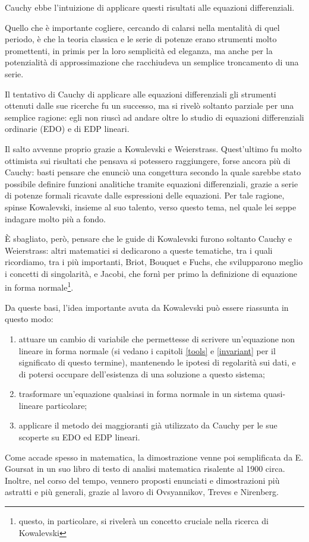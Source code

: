Cauchy ebbe l'intuizione di applicare questi risultati alle equazioni differenziali. 

Quello che è importante cogliere, cercando di calarsi nella mentalità di quel periodo, è che la teoria classica e le serie di potenze erano strumenti molto promettenti, in primis per la loro semplicità ed eleganza, ma anche per la potenzialità di approssimazione che racchiudeva un semplice troncamento di una serie.

Il tentativo di Cauchy di applicare alle equazioni differenziali gli strumenti ottenuti dalle sue ricerche fu un successo, ma si rivelò soltanto parziale per una semplice ragione: egli non riuscì ad andare oltre lo studio di equazioni differenziali ordinarie (EDO) e di EDP lineari.

Il salto avvenne proprio grazie a Kowalevski e Weierstrass. Quest'ultimo fu molto ottimista sui risultati che pensava si potessero raggiungere, forse ancora più di Cauchy: basti pensare che enunciò una congettura secondo la quale sarebbe stato possibile definire funzioni analitiche tramite equazioni differenziali, grazie a serie di potenze formali ricavate dalle espressioni delle equazioni.
Per tale ragione, spinse Kowalevski, insieme al suo talento, verso questo tema, nel quale lei seppe indagare molto più a fondo.

È sbagliato, però, pensare che le guide di Kowalevski furono soltanto Cauchy e Weierstrass: altri matematici si dedicarono a queste tematiche, tra i quali ricordiamo, tra i più importanti, Briot, Bouquet e Fuchs, che svilupparono meglio i concetti di singolarità, e Jacobi, che fornì per primo la definizione di equazione in forma normale\footnote{questo, in particolare, si rivelerà un concetto cruciale nella ricerca di Kowalevski}.

Da queste basi, l’idea importante avuta da Kowalevski può essere riassunta in questo modo: 
\begin{enumerate}
\item attuare un cambio di variabile che permettesse di scrivere un'equazione non lineare in forma normale (si vedano i capitoli \ref{tools} e \ref{invariant} per il significato di questo termine), mantenendo le ipotesi di regolarità sui dati, e di potersi occupare dell’esistenza di una soluzione a questo sistema;
\item trasformare un'equazione qualsiasi in forma normale in un sistema quasi-lineare particolare;
\item applicare il metodo dei maggioranti già utilizzato da Cauchy per le sue scoperte su EDO ed EDP lineari.
\end{enumerate}
Come accade spesso in matematica, la dimostrazione venne poi semplificata da E. Goursat in un suo libro di testo di analisi matematica risalente al 1900 circa. Inoltre, nel corso del tempo, vennero proposti enunciati e dimostrazioni più astratti e più generali, grazie al lavoro di Ovsyannikov, Treves e Nirenberg.

